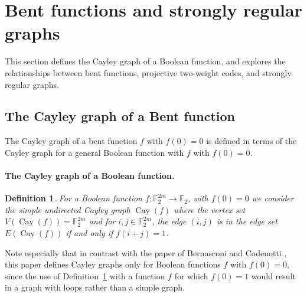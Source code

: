 \documentclass[12pt,a4paper]{article}
\newcommand{\mb}[1]{\mathbb{#1}}
\newcommand{\F}{\mb{F}}
\newcommand{\To}{\rightarrow}
\newcommand{\Cay}[1]{\operatorname{Cay}\left(#1\right)}
\newtheorem{Definition}{Definition}
\begin{document}
%
%

\section{Bent functions and strongly regular graphs}
\label{sec-Bent-graphs}
This section defines the Cayley graph of a Boolean function,
and explores the relationships between bent functions, projective two-weight codes, and strongly regular graphs.
\subsection{The Cayley graph of a Bent function}

The Cayley graph of a bent function $f$ with $f(0)=0$ is defined
in terms of the Cayley graph for a general Boolean function with $f$ with $f(0)=0$.
\paragraph*{The Cayley graph of a Boolean function.}
\begin{Definition}
\label{def-Cayley-graph}
For a Boolean function $f : \F_2^{2 m} \To \F_2$, with $f(0)=0$ we consider the simple undirected
\emph{Cayley graph} $\Cay{f}$  \cite[3.1]{BerC99}
where the vertex set $V(\Cay{f}) = \F_2^{2 m}$ and for $i,j \in \F_2^{2 m}$, the edge $(i,j)$ is in
the edge set $E(\Cay{f})$ if and only if $f(i+j)=1$.
\end{Definition}
Note especially that in contrast with the paper of Bernasconi and Codenotti \cite{BerC99},
this paper defines Cayley graphs only for Boolean functions $f$ with $f(0)=0$,
since the use of Definition~\ref{def-Cayley-graph} with a function $f$ for which $f(0)=1$ would
result in a graph with loops rather than a simple graph.

\end{document}
